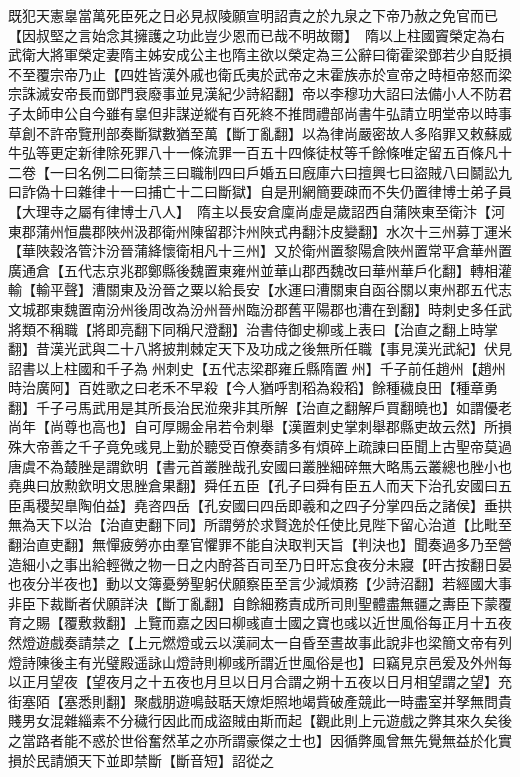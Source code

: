 既犯天憲辠當萬死臣死之日必見叔陵願宣明詔責之於九泉之下帝乃赦之免官而已【因叔堅之言始念其擁護之功此豈少恩而已哉不明故爾】　隋以上柱國竇榮定為右武衛大將軍榮定妻隋主姊安成公主也隋主欲以榮定為三公辭曰衛霍梁鄧若少自貶損不至覆宗帝乃止【四姓皆漢外戚也衛氏夷於武帝之末霍族赤於宣帝之時桓帝怒而梁宗誅滅安帝長而鄧門衰廢事並見漢紀少詩紹翻】帝以李穆功大詔曰法備小人不防君子太師申公自今雖有辠但非謀逆縱有百死終不推問禮部尚書牛弘請立明堂帝以時事草創不許帝覽刑部奏斷獄數猶至萬【斷丁亂翻】以為律尚嚴密故人多陷罪又敕蘇威牛弘等更定新律除死罪八十一條流罪一百五十四條徒杖等千餘條唯定留五百條凡十二卷【一曰名例二曰衛禁三曰職制四曰戶婚五曰廐庫六曰擅興七曰盜賊八曰鬬訟九曰詐偽十曰雜律十一曰捕亡十二曰斷獄】自是刑網簡要疎而不失仍置律博士弟子員【大理寺之屬有律博士八人】　隋主以長安倉廩尚虛是歲詔西自蒲陜東至衛汴【河東郡蒲州恒農郡陜州汲郡衛州陳留郡汴州陜式冉翻汴皮變翻】水次十三州募丁運米【華陜穀洛管汴汾晉蒲絳懷衛相凡十三州】又於衛州置黎陽倉陜州置常平倉華州置廣通倉【五代志京兆郡鄭縣後魏置東雍州並華山郡西魏改曰華州華戶化翻】轉相灌輸【輸平聲】漕關東及汾晉之粟以給長安【水運曰漕關東自函谷關以東州郡五代志文城郡東魏置南汾州後周改為汾州晉州臨汾郡舊平陽郡也漕在到翻】時刺史多任武將類不稱職【將即亮翻下同稱尺澄翻】治書侍御史柳彧上表曰【治直之翻上時掌翻】昔漢光武與二十八將披荆棘定天下及功成之後無所任職【事見漢光武紀】伏見詔書以上柱國和千子為州刺史【五代志梁郡雍丘縣隋置州】千子前任趙州【趙州時治廣阿】百姓歌之曰老禾不早殺【今人猶呼割稻為殺稻】餘種穢良田【種章勇翻】千子弓馬武用是其所長治民涖衆非其所解【治直之翻解戶買翻曉也】如謂優老尚年【尚尊也高也】自可厚賜金帛若令刺舉【漢置刺史掌刺舉郡縣吏故云然】所損殊大帝善之千子竟免彧見上勤於聽受百僚奏請多有煩碎上疏諫曰臣聞上古聖帝莫過唐虞不為樷脞是謂欽明【書元首叢脞哉孔安國曰叢脞細碎無大略馬云叢總也脞小也堯典曰放勲欽明文思脞倉果翻】舜任五臣【孔子曰舜有臣五人而天下治孔安國曰五臣禹稷契臯陶伯益】堯咨四岳【孔安國曰四岳即羲和之四子分掌四岳之諸侯】垂拱無為天下以治【治直吏翻下同】所謂勞於求賢逸於任使比見陛下留心治道【比毗至翻治直吏翻】無憚疲勞亦由羣官懼罪不能自決取判天旨【判決也】聞奏過多乃至營造細小之事出給輕微之物一日之内酧荅百司至乃日旰忘食夜分未寢【旰古按翻日晏也夜分半夜也】動以文簿憂勞聖躬伏願察臣至言少減煩務【少詩沼翻】若經國大事非臣下裁斷者伏願詳決【斷丁亂翻】自餘細務責成所司則聖體盡無疆之夀臣下蒙覆育之賜【覆敷救翻】上覽而嘉之因曰柳彧直士國之寶也彧以近世風俗每正月十五夜然燈遊戲奏請禁之【上元燃燈或云以漢祠太一自昏至晝故事此說非也梁簡文帝有列燈詩陳後主有光璧殿遥詠山燈詩則柳彧所謂近世風俗是也】曰竊見京邑爰及外州每以正月望夜【望夜月之十五夜也月旦以日月合謂之朔十五夜以日月相望謂之望】充街塞陌【塞悉則翻】聚戲朋遊鳴鼓聒天燎炬照地竭貲破產競此一時盡室并孥無問貴賤男女混雜緇素不分穢行因此而成盜賊由斯而起【觀此則上元遊戲之弊其來久矣後之當路者能不惑於世俗奮然革之亦所謂豪傑之士也】因循弊風曾無先覺無益於化實損於民請頒天下並即禁斷【斷音短】詔從之

